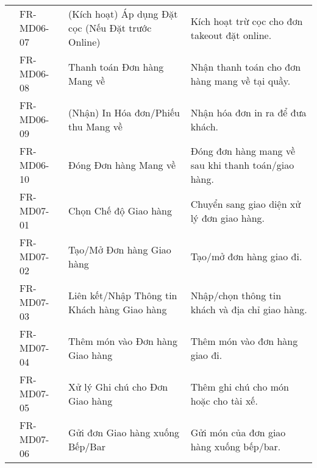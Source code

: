 \begin{longtable}{|m{2.5cm}|m{2.5cm}|m{5cm}|m{5cm}|}
	                                                        & FR-MD06-07            & (Kích hoạt) Áp dụng Đặt cọc (Nếu Đặt trước Online)     & Kích hoạt trừ cọc cho đơn takeout đặt online.                                               \\
	                                                        & FR-MD06-08            & Thanh toán Đơn hàng Mang về                            & Nhận thanh toán cho đơn hàng mang về tại quầy.                                              \\
	                                                        & FR-MD06-09            & (Nhận) In Hóa đơn/Phiếu thu Mang về                    & Nhận hóa đơn in ra để đưa khách.                                                            \\
	                                                        & FR-MD06-10            & Đóng Đơn hàng Mang về                                  & Đóng đơn hàng mang về sau khi thanh toán/giao hàng.                                         \\ \cline{2-4}
	                                                        & FR-MD07-01            & Chọn Chế độ Giao hàng                                  & Chuyển sang giao diện xử lý đơn giao hàng.                                                  \\
	                                                        & FR-MD07-02            & Tạo/Mở Đơn hàng Giao hàng                              & Tạo/mở đơn hàng giao đi.                                                                    \\
	                                                        & FR-MD07-03            & Liên kết/Nhập Thông tin Khách hàng Giao hàng           & Nhập/chọn thông tin khách và địa chỉ giao hàng.                                             \\
	                                                        & FR-MD07-04            & Thêm món vào Đơn hàng Giao hàng                        & Thêm món vào đơn hàng giao đi.                                                              \\
	                                                        & FR-MD07-05            & Xử lý Ghi chú cho Đơn Giao hàng                        & Thêm ghi chú cho món hoặc cho tài xế.                                                       \\
	                                                        & FR-MD07-06            & Gửi đơn Giao hàng xuống Bếp/Bar                        & Gửi món của đơn giao hàng xuống bếp/bar.                                                    \\

\end{longtable}
